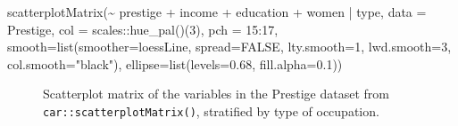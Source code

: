 \documentclass[
  letterpaper,
  10pt,
  krantz2]{krantz}
\makeatletter
\newenvironment{Shaded}{\begin{snugshade}}{\end{snugshade}}
\newcommand{\AttributeTok}[1]{\textcolor[rgb]{0.40,0.45,0.13}{#1}}
\newcommand{\ConstantTok}[1]{\textcolor[rgb]{0.56,0.35,0.01}{#1}}
\newcommand{\DecValTok}[1]{\textcolor[rgb]{0.68,0.00,0.00}{#1}}
\newcommand{\FloatTok}[1]{\textcolor[rgb]{0.68,0.00,0.00}{#1}}
\newcommand{\FunctionTok}[1]{\textcolor[rgb]{0.28,0.35,0.67}{#1}}
\newcommand{\NormalTok}[1]{\textcolor[rgb]{0.00,0.23,0.31}{#1}}
\newcommand{\SpecialCharTok}[1]{\textcolor[rgb]{0.37,0.37,0.37}{#1}}
\newcommand{\StringTok}[1]{\textcolor[rgb]{0.13,0.47,0.30}{#1}}
\newenvironment{kframe}{%
  \medskip{}
  \setlength{\fboxsep}{.8em}
  \def\at@end@of@kframe{}%
  \ifinner\ifhmode%
  \def\at@end@of@kframe{\end{minipage}}%
  \begin{minipage}{\columnwidth}%
  \fi\fi%
  \def\FrameCommand##1{\hskip\@totalleftmargin \hskip-\fboxsep
  \colorbox{shadecolor}{##1}\hskip-\fboxsep
      \hskip-\linewidth \hskip-\@totalleftmargin \hskip\columnwidth}%
  \MakeFramed {\advance\hsize-\width
    \@totalleftmargin\z@ \linewidth\hsize
    \@setminipage}}%
{\par\unskip\endMakeFramed%
  \at@end@of@kframe}
\renewenvironment{Shaded}{\begin{kframe}}{\end{kframe}}
\makeatother
\begin{document}
\begin{Shaded}
\begin{Highlighting}[]
\FunctionTok{scatterplotMatrix}\NormalTok{(}\SpecialCharTok{\textasciitilde{}}\NormalTok{ prestige }\SpecialCharTok{+}\NormalTok{ income }\SpecialCharTok{+}\NormalTok{ education }\SpecialCharTok{+}\NormalTok{ women }\SpecialCharTok{|}\NormalTok{ type,}
  \AttributeTok{data =}\NormalTok{ Prestige,}
  \AttributeTok{col =}\NormalTok{ scales}\SpecialCharTok{::}\FunctionTok{hue\_pal}\NormalTok{()(}\DecValTok{3}\NormalTok{),}
  \AttributeTok{pch =} \DecValTok{15}\SpecialCharTok{:}\DecValTok{17}\NormalTok{,}
  \AttributeTok{smooth=}\FunctionTok{list}\NormalTok{(}\AttributeTok{smoother=}\NormalTok{loessLine, }\AttributeTok{spread=}\ConstantTok{FALSE}\NormalTok{,}
              \AttributeTok{lty.smooth=}\DecValTok{1}\NormalTok{, }\AttributeTok{lwd.smooth=}\DecValTok{3}\NormalTok{, }\AttributeTok{col.smooth=}\StringTok{"black"}\NormalTok{),}
  \AttributeTok{ellipse=}\FunctionTok{list}\NormalTok{(}\AttributeTok{levels=}\FloatTok{0.68}\NormalTok{, }\AttributeTok{fill.alpha=}\FloatTok{0.1}\NormalTok{))}
\end{Highlighting}
\end{Shaded}

\begin{figure}[H]


\caption{\label{fig-prestige-spm2}Scatterplot matrix of the variables in
the Prestige dataset from \texttt{car::scatterplotMatrix()}, stratified
by type of occupation.}

\end{figure}%
\end{document}

